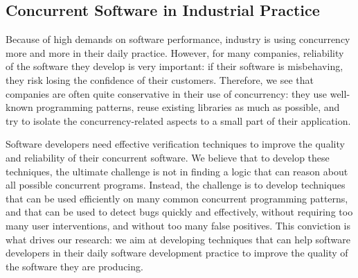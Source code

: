 



\subsection{Concurrent Software in Industrial Practice}
Because of high demands on software performance, industry is using concurrency more and more in their daily practice. However, for many companies, reliability of the software they develop is very important: if their software is misbehaving, they risk losing the confidence of their customers. Therefore, we see that companies are often quite conservative in their use of concurrency: they use well-known programming patterns, reuse existing libraries as much as possible, and try to isolate the concurrency-related aspects to a small part of their application.

Software developers need effective verification techniques to improve the quality and reliability of their concurrent software.
We believe that to develop these techniques, the ultimate challenge is not in finding a logic that can reason about all possible concurrent programs.
Instead, the challenge is to develop techniques that can be used efficiently on many common concurrent programming patterns, and that can be used to detect bugs quickly and effectively, without requiring too many user interventions, and without too many false positives. This conviction is what drives our research: we aim at developing techniques that can help software developers in their daily software development practice to improve the quality of the software they are producing.


